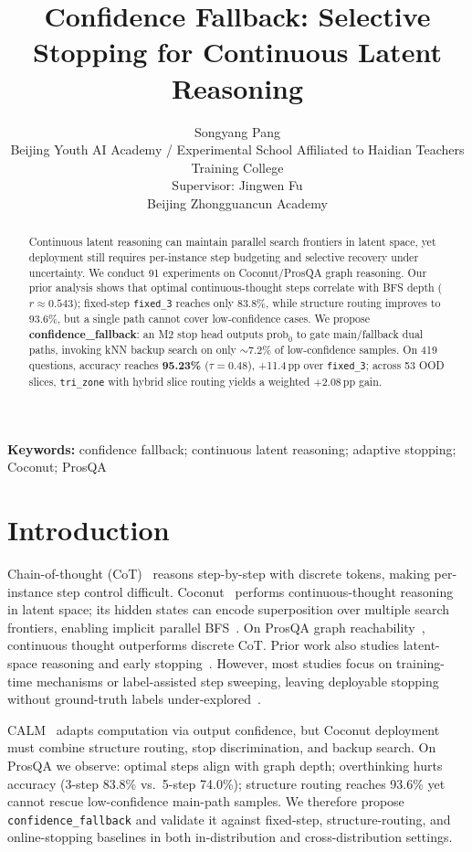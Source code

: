 \documentclass[11pt,a4paper]{article}
\title{Confidence Fallback: Selective Stopping for Continuous Latent Reasoning}
\author{Songyang Pang\\
\small Beijing Youth AI Academy / Experimental School Affiliated to Haidian Teachers Training College\\
\small Supervisor: Jingwen Fu\\
\small Beijing Zhongguancun Academy}
\date{}
\begin{document}
\maketitle

\begin{abstract}
Continuous latent reasoning can maintain parallel search frontiers in latent space, yet deployment still requires per-instance step budgeting and selective recovery under uncertainty. We conduct 91 experiments on Coconut/ProsQA graph reasoning. Our prior analysis shows that optimal continuous-thought steps correlate with BFS depth ($r\approx0.543$); fixed-step \texttt{fixed\_3} reaches only 83.8\%, while structure routing improves to 93.6\%, but a single path cannot cover low-confidence cases. We propose \textbf{confidence\_fallback}: an M2 stop head outputs $\mathrm{prob}_0$ to gate main/fallback dual paths, invoking kNN backup search on only $\sim$7.2\% of low-confidence samples. On 419 questions, accuracy reaches \textbf{95.23\%} ($\tau{=}0.48$), +11.4\,pp over \texttt{fixed\_3}; across 53 OOD slices, \texttt{tri\_zone} with hybrid slice routing yields a weighted +2.08\,pp gain.
\end{abstract}

\noindent\textbf{Keywords:} confidence fallback; continuous latent reasoning; adaptive stopping; Coconut; ProsQA

\section{Introduction}
Chain-of-thought (CoT)~\cite{wei2022cot} reasons step-by-step with discrete tokens, making per-instance step control difficult. Coconut~\cite{hao2024coconut} performs continuous-thought reasoning in latent space; its hidden states can encode superposition over multiple search frontiers, enabling implicit parallel BFS~\cite{zhu2025superposition}. On ProsQA graph reachability~\cite{hao2024prosqa}, continuous thought outperforms discrete CoT. Prior work also studies latent-space reasoning and early stopping~\cite{goyal2023thoughts,pfau2024dotbydot,zhou2023earlyexit}. However, most studies focus on training-time mechanisms or label-assisted step sweeping, leaving deployable stopping without ground-truth labels under-explored~\cite{schuster2022calm}.

CALM~\cite{schuster2022calm} adapts computation via output confidence, but Coconut deployment must combine structure routing, stop discrimination, and backup search. On ProsQA we observe: optimal steps align with graph depth; overthinking hurts accuracy (3-step 83.8\% vs.\ 5-step 74.0\%); structure routing reaches 93.6\% yet cannot rescue low-confidence main-path samples. We therefore propose \texttt{confidence\_fallback} and validate it against fixed-step, structure-routing, and online-stopping baselines in both in-distribution and cross-distribution settings.
\end{document}
